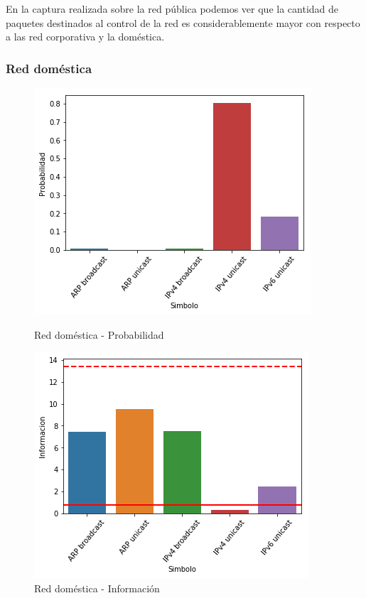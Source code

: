 En la captura realizada sobre la red pública podemos ver que la cantidad de paquetes destinados al control de la red es considerablemente mayor con respecto a las red corporativa y la doméstica.

\subsubsection{Red doméstica}

\begin{figure}[H]
	\begin{minipage}{0.49\textwidth}
		\centering
		\includegraphics[width=\linewidth]{imagenes/manu_casa_barras_prob}
		\caption{Red doméstica - Probabilidad}
		\label{casa_barras_prob}
	\end{minipage}
	\begin{minipage}{0.49\textwidth}
		\centering
		\includegraphics[width=\linewidth]{imagenes/manu_casa_barras_info}
		\caption{Red doméstica - Información}
		\label{casa_barras_info}
	\end{minipage}
\end{figure}

